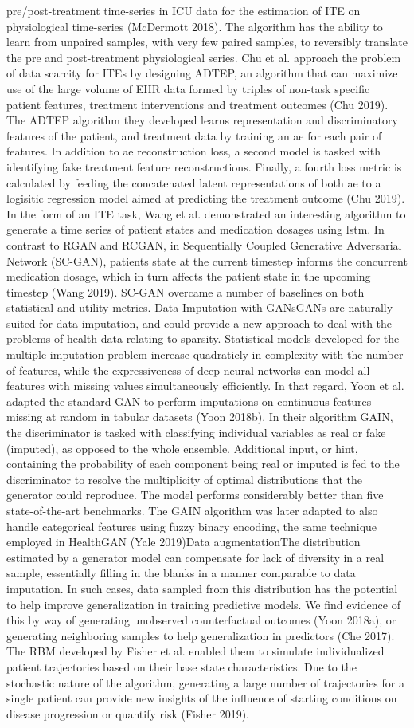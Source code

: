 pre/post-treatment time-series in ICU data for the estimation of ITE on physiological time-series (McDermott 2018). The algorithm has the ability to learn from unpaired samples, with very few paired samples, to reversibly translate the pre and post-treatment physiological series. Chu et al. approach the problem of data scarcity for ITEs by designing ADTEP, an algorithm that can maximize use of the large volume of EHR data formed by triples of non-task specific patient features, treatment interventions and treatment outcomes (Chu 2019). The ADTEP algorithm they developed learns representation and discriminatory features of the patient, and treatment data by training an \gls{ae} for each pair of features. In addition to \gls{ae} reconstruction loss, a second model is tasked with identifying fake treatment feature reconstructions. Finally, a fourth loss metric is calculated by feeding the concatenated latent representations of both \gls{ae} to a logisitic regression model aimed at predicting the treatment outcome (Chu 2019). In the form of an ITE task, Wang et al. demonstrated an interesting algorithm to generate a time series of patient states and medication dosages using \gls{lstm}. In contrast to RGAN and RCGAN, in Sequentially Coupled Generative Adversarial Network (SC-GAN), patients state at the current timestep informs the concurrent medication dosage, which in turn affects the patient state in the upcoming timestep (Wang 2019). SC-GAN overcame a number of baselines on both statistical and utility metrics. Data Imputation with GANsGANs are naturally suited for data imputation, and could provide a new approach to deal with the problems of health data relating to sparsity. Statistical models developed for the multiple imputation problem increase quadraticly in complexity with the number of features, while the expressiveness of deep neural networks can model all features with missing values simultaneously efficiently. In that regard, Yoon et al. adapted the standard GAN to perform imputations on continuous features missing at random in tabular datasets (Yoon 2018b). In their algorithm GAIN, the discriminator is tasked with classifying individual variables as real or fake (imputed), as opposed to the whole ensemble. Additional input, or hint, containing the probability of each component being real or imputed is fed to the discriminator to resolve the multiplicity of optimal distributions that the generator could reproduce. The model performs considerably better than five state-of-the-art benchmarks. The GAIN algorithm was later adapted to also handle categorical features using fuzzy binary encoding, the same technique employed in HealthGAN (Yale 2019)Data augmentationThe distribution estimated by a generator model can compensate for lack of diversity in a real sample, essentially filling in the blanks in a manner comparable to data imputation. In such cases, data sampled from this distribution has the potential to help improve generalization in training predictive models. We find evidence of this by way of generating unobserved counterfactual outcomes (Yoon 2018a), or generating neighboring samples to help generalization in predictors (Che 2017). The RBM developed by Fisher et al. enabled them to simulate individualized patient trajectories based on their base state characteristics. Due to the stochastic nature of the algorithm, generating a large number of trajectories for a single patient can provide new insights of the influence of starting conditions on disease progression or quantify risk (Fisher 2019).